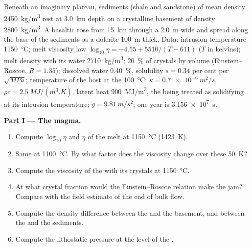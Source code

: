 \begin{problem}
\label{pb:b2:magma-emplacement:1}
Beneath an imaginary plateau, sediments (shale and sandstone) of mean density
\qty{2450}{kg/m^3} rest at \qty{3.0}{km} depth on a crystalline basement of
density \qty{2800}{kg/m^3}. A basaltic  rose from \qty{15}{km} through a 
\qty{2.0}{m} wide and spread along the base of the sediments as a dolerite 
\qty{100}{m} thick. Data: intrusion temperature \qty{1150}{\celsius}; melt
viscosity law $\log_{10}\eta = -4.55 + 5510/(T - 611)$ ($T$ in kelvins); melt
density with its water \qty{2710}{kg/m^3}; \qty{20}{\percent} of crystals by volume
(Einstein--Roscoe, $R = 1.35$); dissolved water \qty{0.40}{\percent}, solubility
$s = 0.34$ per cent per $\sqrt{\unit{MPa}}$; temperature of the host at the 
\qty{100}{\celsius}; $\kappa = \qty{0.7e-6}{m^2/s}$, $\rho c = \qty{2.5}{MJ/(m^3.K)}$,
latent heat \qty{900}{MJ/m^3}, the  being treated as solidifying at its
intrusion temperature; $g = \qty{9.81}{m/s^2}$; one year is \qty{3.156e7}{s}.

\medskip\noindent\textbf{Part I --- The magma.}
\begin{enumerate}
\item Compute $\log_{10}\eta$ and $\eta$ of the melt at \qty{1150}{\celsius}
(\qty{1423}{K}).
\item Same at \qty{1100}{\celsius}. By what factor does the viscosity change over
these \qty{50}{K}?
\item Compute the viscosity of the  with its crystals at
\qty{1150}{\celsius}.
\item At what crystal fraction would the Einstein--Roscoe relation make the
 jam? Compare with the field estimate of the end of bulk flow.
\item Compute the density difference between the  and the basement, and
between the  and the sediments.
\item Compute the lithostatic pressure at the level of the .
\end{enumerate}


\end{problem}
